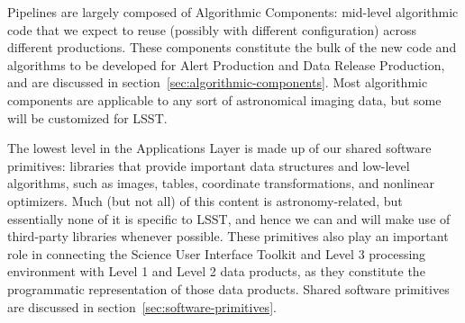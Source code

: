 Pipelines are largely composed of Algorithmic Components: mid-level algorithmic code that we expect to reuse (possibly with different configuration) across different productions.  These components constitute the bulk of the new code and algorithms to be developed for Alert Production and Data Release Production, and are discussed in section~\ref{sec:algorithmic-components}.  Most algorithmic components are applicable to any sort of astronomical imaging data, but some will be customized for LSST.

The lowest level in the Applications Layer is made up of our shared software primitives: libraries that provide important data structures and low-level algorithms, such as images, tables, coordinate transformations, and nonlinear optimizers.  Much (but not all) of this content is astronomy-related, but essentially none of it is specific to LSST, and hence we can and will make use of third-party libraries whenever possible.  These primitives also play an important role in connecting the Science User Interface Toolkit and Level 3 processing environment with Level 1 and Level 2 data products, as they constitute the programmatic representation of those data products.  Shared software primitives are discussed in section~\ref{sec:software-primitives}.
